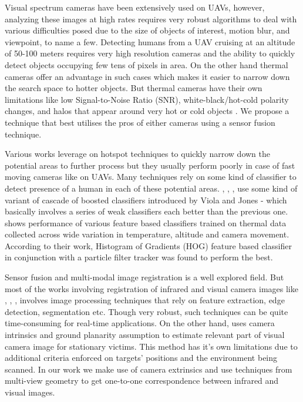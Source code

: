 \documentclass[runningheads]{llncs}
\begin{document}
Visual spectrum cameras have been extensively used on UAVs, however, analyzing these images at high rates requires very robust algorithms to deal with various difficulties posed due to the size of objects of interest, motion blur, and viewpoint, to name a few. Detecting humans from a UAV cruising at an altitude of 50-100 meters requires very high resolution cameras and the ability to quickly detect objects occupying few tens of pixels in area. On the other hand thermal cameras offer an advantage in such cases which makes it easier to narrow down the search space to hotter objects. But thermal cameras have their own limitations like low Signal-to-Noise Ratio (SNR), white-black/hot-cold polarity changes, and halos that appear around very hot or cold objects \cite{wang2010improved}. We propose a technique that best utilises the pros of either cameras using a sensor fusion technique.

Various works leverage on hotspot techniques to quickly narrow down the potential areas to further process but they usually perform poorly in case of fast moving cameras like on UAVs. Many techniques rely on some kind of classifier to detect presence of a human in each of these potential areas. \cite{davis2005two}, \cite{1545530}, \cite{rudol2008human}, \cite{wang2010improved} use some kind of variant of cascade of boosted classifiers introduced by Viola and Jones \cite{viola2001rapid} - which basically involves a series of weak classifiers each better than the previous one. \cite{portmann2014people} shows performance of various feature based classifiers trained on thermal data collected across wide variation in temperature, altitude and camera movement. According to their work, Histogram of Gradients (HOG) feature based classifier in conjunction with a particle filter tracker was found to perform the best.

Sensor fusion and multi-modal image registration is a well explored field. But most of the works involving registration of infrared and visual camera images like \cite{doi:10.1117/12.7977034}, \cite{1384918}, \cite{4381164}, \cite{3911} involves image processing techniques that rely on feature extraction, edge detection, segmentation etc. Though very robust, such techniques can be quite time-consuming for real-time applications. On the other hand, \cite{rudol2008human} uses camera intrinsics and ground planarity assumption to estimate relevant part of visual camera image for stationary victims. This method has it's own limitations due to additional criteria enforced on targets' positions and the environment being scanned. In our work we make use of camera extrinsics and use techniques from multi-view geometry to get one-to-one correspondence between infrared and visual images.
\end{document}
